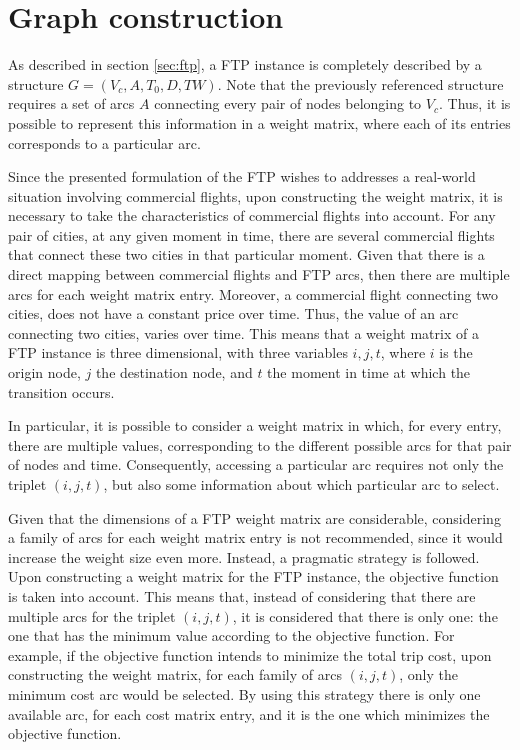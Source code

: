 \section{Graph construction}
\label{sec:ftp_graph}


As described in section \ref{sec:ftp}, a FTP instance is completely described by a structure 
$G =(V_c, A, T_{0}, D, TW)$. Note that the previously referenced structure requires a set of arcs $A$ connecting every pair of nodes belonging to $V_c$. Thus, it is possible to represent this information in a weight matrix, where each of its entries corresponds to a particular arc.

Since the presented formulation of the FTP wishes to addresses a real-world situation involving commercial flights, upon constructing the weight matrix, it is necessary to take the characteristics of commercial flights into account. For any pair of cities, at any given moment in time, there are several commercial flights that connect these two cities in that particular moment. Given that there is a direct mapping between commercial flights and FTP arcs, then there are multiple arcs for each weight matrix entry. Moreover, a commercial flight connecting two cities, does not have a constant price over time. Thus, the value of an arc connecting two cities, varies over time. This means that a weight matrix of a FTP instance is three dimensional, with three variables $i, j, t$, where $i$ is the origin node, $j$ the destination node, and $t$ the moment in time at which the transition occurs.

In particular, it is possible to consider a weight matrix in which, for every entry, there are multiple values, corresponding to the different possible arcs for that pair of nodes and time. Consequently, accessing a particular arc requires not only the triplet $(i, j, t)$, but also some information about which particular arc to select. 

Given that the dimensions of a FTP weight matrix are considerable, considering a family of arcs for each weight matrix entry is not recommended, since it would increase the weight size even more. Instead, a pragmatic strategy is followed. Upon constructing a weight matrix for the FTP instance, the objective function is taken into account. This means that, instead of considering that there are multiple arcs for the triplet $(i, j, t)$, it is considered that there is only one: the one that has the minimum value according to the objective function. For example, if the objective function intends to minimize the total trip cost, upon constructing the weight matrix, for each family of arcs $(i, j, t)$, only the minimum cost arc would be selected. By using this strategy there is only one available arc, for each cost matrix entry, and it is the one which minimizes the objective function.

